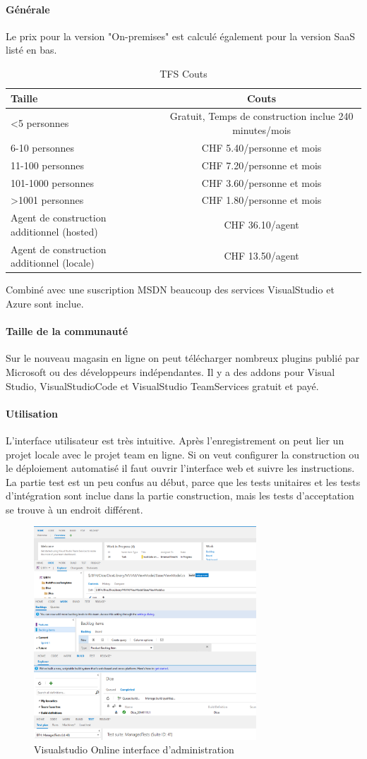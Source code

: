 \paragraph{Générale}  Le prix pour la version "On-premises" est calculé également pour la version SaaS listé en bas.
\begin{table} [H]
	\centering
		\begin{tabular}{l|c} \toprule
			\textbf{Taille} & \textbf{Couts} \\ \midrule
			<5 personnes & Gratuit, Temps de construction inclue 240 minutes/mois \\
			6-10 personnes & CHF 5.40/personne et mois \\
			11-100 personnes & CHF 7.20/personne et mois\\
			101-1000 personnes & CHF 3.60/personne et mois \\
			>1001 personnes & CHF 1.80/personne et mois \\ \midrule
			Agent de construction additionnel (hosted) & CHF 36.10/agent \\
			Agent de construction additionnel (locale) & CHF 13.50/agent \\ \bottomrule
		\end{tabular}
	\caption{TFS Couts}
\end{table}
Combiné avec une suscription MSDN beaucoup des services VisualStudio et Azure sont inclue.
\paragraph{Taille de la communauté} Sur le nouveau magasin en ligne on peut télécharger nombreux plugins publié par Microsoft ou des développeurs indépendantes. Il y a des addons pour Visual Studio, VisualStudioCode et VisualStudio TeamServices gratuit et payé.
\paragraph{Utilisation} L'interface utilisateur est très intuitive. Après l'enregistrement on peut lier un projet locale avec le projet team en ligne. Si on veut configurer la construction ou le déploiement automatisé il faut ouvrir l'interface web et suivre les instructions. 
La partie test est un peu confus au début, parce que les tests unitaires et les tests d'intégration sont inclue dans la partie construction, mais les tests d'acceptation se trouve à un endroit différent.

\begin{figure}[H]
	\centering
		\includegraphics[height=8cm]{bilder/vso}
	\caption{Visualstudio Online interface d'administration}
	\label{fig:vsogui}
\end{figure}

